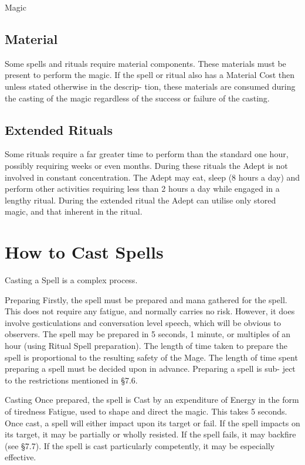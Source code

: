 \begin{Chapter}{Magic}
\begin{Description}
\end{Description}

\subsection{Material}

Some spells and rituals require material components.  These materials
must be present to perform the magic.  If the spell or ritual also has
a Material Cost then unless stated otherwise in the descrip- tion,
these materials are consumed during the casting of the magic
regardless of the success or failure of the casting.


\subsection{Extended Rituals}

Some rituals require a far greater time to perform than the standard
one hour, possibly requiring weeks or even months.  During these
rituals the Adept is not involved in constant concentration.  The
Adept may eat, sleep (8 hours a day) and perform other activities
requiring less than 2 hours a day while engaged in a lengthy ritual.
During the extended ritual the Adept can utilise only stored magic,
and that inherent in the ritual.

\section{How to Cast Spells}

Casting a Spell is a complex process. 

Preparing Firstly, the spell must be prepared and mana gathered for
the spell.  This does not require any fatigue, and normally carries no
risk. However, it does involve gesticulations and conversation level
speech, which will be obvious to observers.  The spell may be prepared
in 5 seconds, 1 minute, or multiples of an hour (using Ritual Spell
preparation). The length of time taken to prepare the spell is
proportional to the resulting safety of the Mage.  The length of time
spent preparing a spell must be decided upon in advance.  Preparing a
spell is sub- ject to the restrictions mentioned in §7.6.

Casting Once prepared, the spell is Cast by an expenditure of Energy
in the form of tiredness Fatigue, used to shape and direct the magic.
This takes 5 seconds.  Once cast, a spell will either impact upon its
target or fail.  If the spell impacts on its target, it may be
partially or wholly resisted.  If the spell fails, it may backfire
(see §7.7).  If the spell is cast particularly competently, it may be
especially effective.


\end{Chapter}
